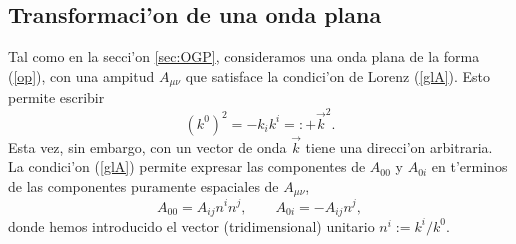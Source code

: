 \subsection{Transformaci'on de una onda plana}\label{sec:TOP}
Tal como en la secci'on \ref{sec:OGP}, consideramos una onda plana de la forma (\ref{op}), con una ampitud $A_{\mu\nu}$ que satisface la condici'on de Lorenz  (\ref{glA}). Esto permite escribir
\begin{equation}
 (k^0)^2=-k_ik^i=:+\vec{k}^2.
\end{equation}
Esta vez, sin embargo, con un vector de onda $\vec{k}$ tiene una direcci'on arbitraria. La condici'on (\ref{glA}) permite expresar las componentes de $A_{00}$ y $A_{0i}$ en t'erminos de las componentes puramente espaciales de $A_{\mu\nu}$,
\begin{equation}\label{A000i}
A_{00}=A_{ij}n^in^j, \qquad A_{0i}=-A_{ij}n^j,
\end{equation}
donde hemos introducido el vector (tridimensional) unitario $n^i:=k^i/k^0$.

